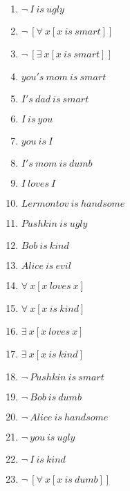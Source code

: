\documentclass{article}
\begin{document}
\begin{enumerate}
\item $\neg \ I \ is \ ugly$

\item $\neg \ [\forall \ x[x \ is \ smart]]$

\item $\neg \ [\exists \ x[x \ is \ smart]]$

\item $you's \ mom \ is \ smart$

\item $I's \ dad \ is \ smart$

\item $I \ is \ you$

\item $you \ is \ I$

\item $I's \ mom \ is \ dumb$

\item $I \ loves \ I$

\item $Lermontov \ is \ handsome$

\item $Pushkin \ is \ ugly$

\item $Bob \ is \ kind$

\item $Alice \ is \ evil$

\item $\forall \ x[x \ loves \ x]$

\item $\forall \ x[x \ is \ kind]$

\item $\exists \ x[x \ loves \ x]$

\item $\exists \ x[x \ is \ kind]$

\item $\neg \ Pushkin \ is \ smart$

\item $\neg \ Bob \ is \ dumb$

\item $\neg \ Alice \ is \ handsome$

\item $\neg \ you \ is \ ugly$

\item $\neg \ I \ is \ kind$

\item $\neg \ [\forall \ x[x \ is \ dumb]]$


\end{enumerate}
\end{document}
